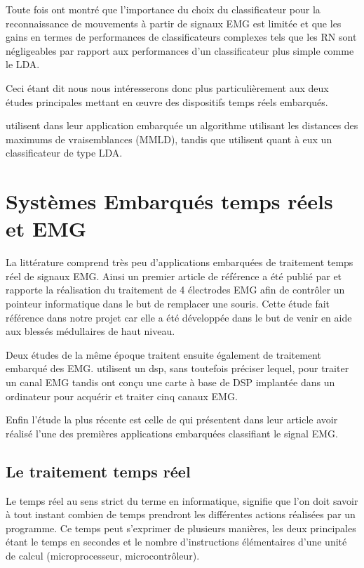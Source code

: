 \documentclass[letterpaper, twoside, 12pt, memoire, creativecommons, hyperref]{thETS}
\begin{document}
Toute fois \cite{englehart1999} ont montré que l'importance du choix du classificateur pour la reconnaissance de mouvements à partir de signaux EMG est limitée et que les gains en termes de performances de classificateurs complexes tels que les RN sont négligeables par rapport aux performances d'un classificateur plus simple comme le LDA.

Ceci étant dit nous nous intéresserons donc plus particulièrement aux deux études principales mettant en œuvre des dispositifs temps réels embarqués.

\cite{Chang1996} utilisent dans leur application embarquée un algorithme utilisant les distances des maximums de vraisemblances (MMLD), tandis que \cite{Tenore2007} utilisent quant à eux un classificateur de type LDA.


\section{Systèmes Embarqués temps réels et EMG}

La littérature comprend très peu d'applications embarquées de traitement temps réel de signaux EMG. Ainsi un premier article de référence a été publié par \cite{Chang1996} et rapporte la réalisation du traitement de 4 électrodes EMG afin de contrôler un pointeur informatique dans le but de remplacer une souris. Cette étude fait référence dans notre projet car elle a été développée dans le but de venir en aide aux blessés médullaires de haut niveau. 

Deux études de la même époque traitent ensuite également de traitement embarqué des EMG. \cite{martinez1999} utilisent un dsp, sans toutefois préciser lequel, pour traiter un canal EMG tandis \cite{Prasad1996} ont conçu une carte à base de DSP implantée dans un ordinateur pour acquérir et traiter cinq canaux EMG.

Enfin l'étude la plus récente est celle de \cite{Tenore2007} qui présentent dans leur article avoir réalisé l'une des premières applications embarquées classifiant le signal EMG.

\subsection{Le traitement temps réel}

Le temps réel au sens strict du terme en informatique, signifie que l’on doit savoir à tout instant combien de temps prendront les différentes actions réalisées par un programme. Ce temps peut s'exprimer de plusieurs manières, les deux principales étant le temps en secondes et le nombre d'instructions élémentaires d'une unité de calcul (microprocesseur, microcontrôleur).
\end{document}
